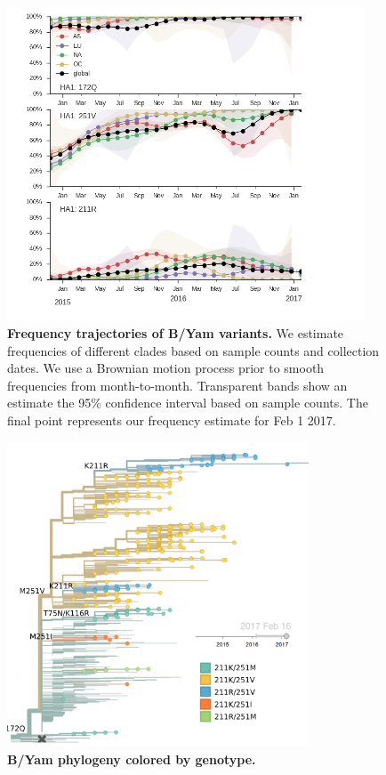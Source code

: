 \documentclass[11pt,oneside,letterpaper]{article}
\begin{document}
\begin{figure}[H]
	\centering
	\includegraphics[width=0.95\textwidth]{../figures/feb-2017/yam_frequencies.png}
	\caption{\textbf{Frequency trajectories of B/Yam variants.}
	We estimate frequencies of different clades based on sample counts and collection dates.
	We use a Brownian motion process prior to smooth frequencies from month-to-month.
	Transparent bands show an estimate the 95\% confidence interval based on sample counts.
	The final point represents our frequency estimate for Feb 1 2017.
	}
	\label{Yam_mutations}
\end{figure}

\begin{figure}[H]
	\centering
	\includegraphics[width=0.8\textwidth]{../figures/feb-2017/yam_tree.png}
	\caption{\textbf{B/Yam phylogeny colored by genotype.}
	}
	\label{Yam_tree}
\end{figure}
\end{document}
